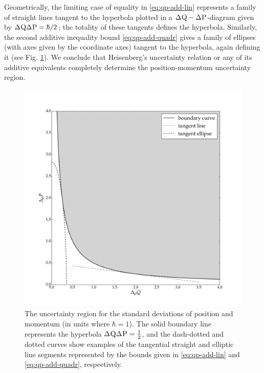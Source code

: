 Geometrically, the limiting case of equality in \eqref{eq:qp-add-lin} represents a family of straight lines tangent to the hyperbola plotted in a $\sdev{\opq}-\sdev{\opp}$-diagram given by $\sdev{\opq}\sdev{\opp}=\hbar/2$; the totality of these tangents defines the hyperbola. Similarly, the second additive inequality bound \eqref{eq:qp-add-quadr} gives a family of ellipses (with axes given by the coordinate axes) tangent to the hyperbola, again defining it (see Fig. \ref{fig:QP-UR}). We conclude that Heisenberg's uncertainty relation or any of its additive equivalents completely determine the position-momentum uncertainty region.


  \begin{figure}[ht]\centering
    \includegraphics[width=\textwidth]{figs/qp-error-region}
    \caption[The uncertainty region for the standard deviations of position and momentum.]{The uncertainty region for the standard deviations of position and momentum (in units where $\hbar = 1$). The solid boundary line represents the hyperbola $\sdev{\opq}\sdev{\opp}=\frac{1}{2}$, and the dash-dotted and dotted curves show examples of the tangential straight and elliptic line segments represented by the bounds given in \eqref{eq:qp-add-lin} and \eqref{eq:qp-add-quadr}, respectively.}\label{fig:QP-UR}
  \end{figure}


